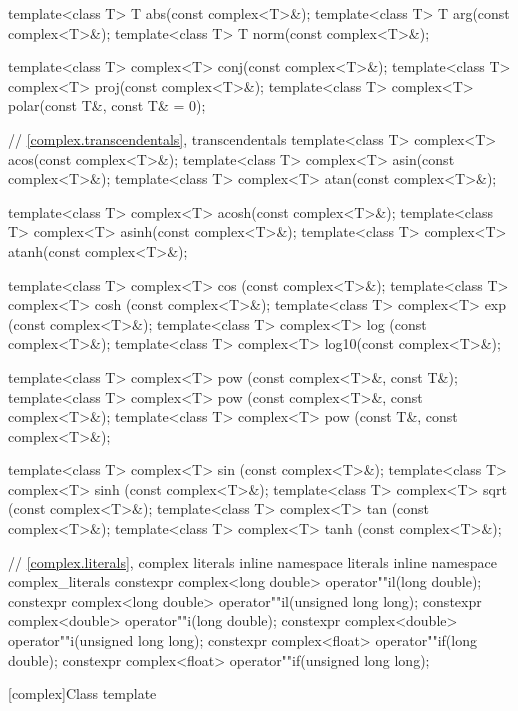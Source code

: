 \begin{codeblock}
{  template<class T> T abs(const complex<T>&);
  template<class T> T arg(const complex<T>&);
  template<class T> T norm(const complex<T>&);

  template<class T> complex<T> conj(const complex<T>&);
  template<class T> complex<T> proj(const complex<T>&);
  template<class T> complex<T> polar(const T&, const T& = 0);

  // \ref{complex.transcendentals}, transcendentals
  template<class T> complex<T> acos(const complex<T>&);
  template<class T> complex<T> asin(const complex<T>&);
  template<class T> complex<T> atan(const complex<T>&);

  template<class T> complex<T> acosh(const complex<T>&);
  template<class T> complex<T> asinh(const complex<T>&);
  template<class T> complex<T> atanh(const complex<T>&);

  template<class T> complex<T> cos  (const complex<T>&);
  template<class T> complex<T> cosh (const complex<T>&);
  template<class T> complex<T> exp  (const complex<T>&);
  template<class T> complex<T> log  (const complex<T>&);
  template<class T> complex<T> log10(const complex<T>&);

  template<class T> complex<T> pow  (const complex<T>&, const T&);
  template<class T> complex<T> pow  (const complex<T>&, const complex<T>&);
  template<class T> complex<T> pow  (const T&, const complex<T>&);

  template<class T> complex<T> sin  (const complex<T>&);
  template<class T> complex<T> sinh (const complex<T>&);
  template<class T> complex<T> sqrt (const complex<T>&);
  template<class T> complex<T> tan  (const complex<T>&);
  template<class T> complex<T> tanh (const complex<T>&);

  // \ref{complex.literals}, complex literals
  inline namespace literals {
    inline namespace complex_literals {
      constexpr complex<long double> operator""il(long double);
      constexpr complex<long double> operator""il(unsigned long long);
      constexpr complex<double> operator""i(long double);
      constexpr complex<double> operator""i(unsigned long long);
      constexpr complex<float> operator""if(long double);
      constexpr complex<float> operator""if(unsigned long long);
    }
  }
}
\end{codeblock}

[complex]{Class template }

